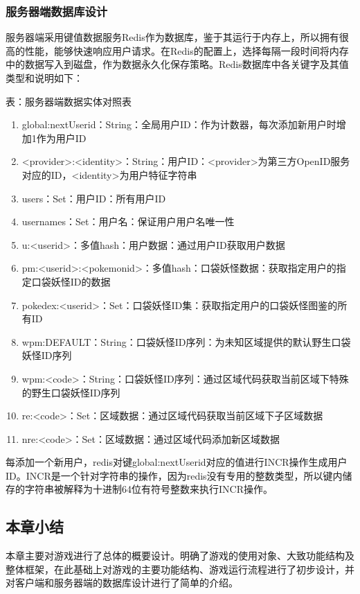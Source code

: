 \documentclass{article}
\begin{document}
\begin{CJK}{UTF8}{gbsn}
	\subsubsection{服务器端数据库设计}
  服务器端采用键值数据服务Redis作为数据库，鉴于其运行于内存上，所以拥有很高的性能，能够快速响应用户请求。在Redis的配置上，选择每隔一段时间将内存中的数据写入到磁盘，作为数据永久化保存策略。Redis数据库中各关键字及其值类型和说明如下：

  表：服务器端数据实体对照表
  \begin{enumerate}
		\item global:nextUserid：String：全局用户ID：作为计数器，每次添加新用户时增加1作为用户ID
		\item <provider>:<identity>：String：用户ID：<provider>为第三方OpenID服务对应的ID，<identity>为用户特征字符串
		\item users：Set：用户ID：所有用户ID
		\item usernames：Set：用户名：保证用户用户名唯一性
		\item u:<userid>：多值hash：用户数据：通过用户ID获取用户数据
		\item pm:<userid>:<pokemonid>：多值hash：口袋妖怪数据：获取指定用户的指定口袋妖怪ID的数据
		\item pokedex:<userid>：Set：口袋妖怪ID集：获取指定用户的口袋妖怪图鉴的所有ID
		\item wpm:DEFAULT：String：口袋妖怪ID序列：为未知区域提供的默认野生口袋妖怪ID序列
		\item wpm:<code>：String：口袋妖怪ID序列：通过区域代码获取当前区域下特殊的野生口袋妖怪ID序列
		\item re:<code>：Set：区域数据：通过区域代码获取当前区域下子区域数据
		\item nre:<code>：Set：区域数据：通过区域代码添加新区域数据
  \end{enumerate}

  每添加一个新用户，redis对键global:nextUserid对应的值进行INCR操作生成用户ID。INCR是一个针对字符串的操作，因为redis没有专用的整数类型，所以键内储存的字符串被解释为十进制64位有符号整数来执行INCR操作。

	\subsection{本章小结}
  本章主要对游戏进行了总体的概要设计。明确了游戏的使用对象、大致功能结构及整体框架，在此基础上对游戏的主要功能结构、游戏运行流程进行了初步设计，并对客户端和服务器端的数据库设计进行了简单的介绍。



\end{CJK}
\end{document}
